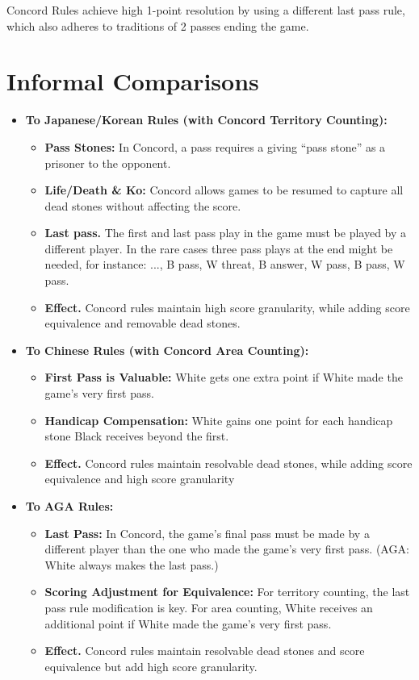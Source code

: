 \documentclass[11pt]{article}
\begin{document}
Concord Rules achieve high 1-point resolution by using a different last pass rule, which also adheres to traditions of 2 passes ending the game.

\newpage

\section{Informal Comparisons}

\begin{itemize}
\item \textbf{To Japanese/Korean Rules (with Concord Territory Counting):}
    \begin{itemize}
    \item \textbf{Pass Stones:} In Concord, a pass requires a giving ``pass stone'' as a prisoner to the opponent.
    \item \textbf{Life/Death \& Ko:} Concord allows games to be resumed to capture all dead stones without affecting the score.
    \item \textbf{Last pass.} The first and last pass play in the game must be played by a different player. In the rare cases three pass plays at the end might be needed, for instance: ..., B pass, W threat, B answer, W pass, B pass, W pass.
    \item \textbf{Effect.} Concord rules maintain high score granularity, while adding score equivalence and removable dead stones.
    \end{itemize}

\item \textbf{To Chinese Rules (with Concord Area Counting):}
    \begin{itemize}
    \item \textbf{First Pass is Valuable:} White gets one extra point if White made the game's very first pass.
    \item \textbf{Handicap Compensation:} White gains one point for each handicap stone Black receives beyond the first.
    \item \textbf{Effect.} Concord rules maintain resolvable dead stones, while adding score equivalence and high score granularity
    \end{itemize}

\item \textbf{To AGA Rules:}
    \begin{itemize}
    \item \textbf{Last Pass:} In Concord, the game's final pass must be made by a different player than the one who made the game's very first pass. (AGA: White always makes the last pass.)
    \item \textbf{Scoring Adjustment for Equivalence:} For territory counting, the last pass rule modification is key. For area counting, White receives an additional point if White made the game's very first pass.
    \item \textbf{Effect.} Concord rules maintain resolvable dead stones and score equivalence but add high score granularity.
    \end{itemize}
\end{itemize}
\end{document}
